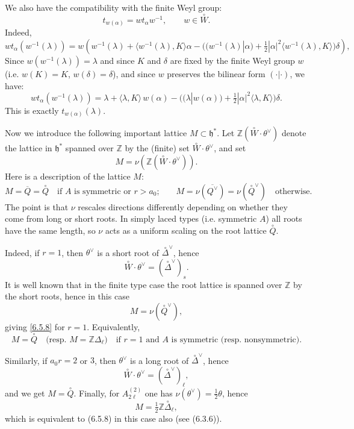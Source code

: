 \documentclass[12pt]{article}
\begin{document}
We also have the compatibility with the finite Weyl group:
\begin{equation}
    t_{w(\alpha)} = w t_\alpha w^{-1}, \qquad w \in \overset{\circ}{W}.
\end{equation}
Indeed,
\[
    w t_\alpha (w^{-1}(\lambda))
    = w\!\left(w^{-1}(\lambda) + \langle w^{-1}(\lambda), K \rangle \alpha
    - \big( (w^{-1}(\lambda)|\alpha)
    + \tfrac{1}{2}|\alpha|^2 \langle w^{-1}(\lambda), K\rangle \big)\delta\right),
\]
Since $w(w^{-1}(\lambda)) = \lambda$ and since $K$ and $\delta$ are fixed by the finite Weyl group $w$ (i.e. $w(K)=K$, $w(\delta)=\delta$), and since $w$ preserves the bilinear form $(\cdot|\cdot)$, we have:
\[
    w t_\alpha(w^{-1}(\lambda)) = \lambda + \langle\lambda,K\rangle\, w(\alpha) - \Big((\lambda|w(\alpha)) + \tfrac12|\alpha|^2\langle \lambda,K\rangle\Big)\delta.
\]
This is exactly $t_{w(\alpha)}(\lambda)$.

Now we introduce the following important lattice $M \subset \mathfrak{h}^*$. Let $\mathbb{Z}(\overset{\circ}{W}\cdot \theta^\vee)$ denote the lattice in $\mathfrak{h}^*$
spanned over $\mathbb{Z}$ by the (finite) set $\overset{\circ}{W}\cdot \theta^\vee$, and set
\[
    M = \nu(\mathbb{Z}(\overset{\circ}{W}\cdot \theta^\vee)).
\]
Here is a description of the lattice $M$:
\begin{equation} \label{6.5.8}
    M = \overline{Q} = \overset{\circ}{Q} \quad \text{if $A$ is symmetric or $r > a_0$;}
    \qquad
    M = \nu(\overline{Q^\vee}) = \nu(\overset{\circ}{Q}^\vee) \quad \text{otherwise.}
\end{equation}
The point is that $\nu$ rescales directions differently depending on whether they come from long or short roots. In simply laced types (i.e. symmetric $A$) all roots have the same length, so $\nu$ acts as a uniform scaling on the root lattice $\overset{\circ}{Q}$.

Indeed, if $r=1$, then $\theta^\vee$ is a short root of $\overset{\circ}{\Delta}^\vee$, hence
\[
    \overset{\circ}{W}\cdot \theta^\vee = (\overset{\circ}{\Delta}^\vee)_s.
\]
It is well known that in the finite type case the root lattice is
spanned over $\mathbb{Z}$ by the short roots, hence in this case
\[
    M = \nu(\overset{\circ}{Q}^\vee),
\]
giving \eqref{6.5.8} for $r=1$. Equivalently,
\[
    M = \overset{\circ}{Q} \quad \text{(resp.\ $M = \mathbb{Z}\Delta_\ell$)}
    \quad \text{if $r=1$ and $A$ is symmetric (resp.\ nonsymmetric).}
\]

Similarly, if $a_0 r = 2$ or $3$, then $\theta^\vee$ is a long root of $\overset{\circ}{\Delta}^\vee$,
hence
\[
    \overset{\circ}{W} \cdot \theta^\vee = (\overset{\circ}{\Delta}^\vee)_\ell,
\]
and we get $M = \overset{\circ}{Q}$. Finally, for $A_{2\ell}^{(2)}$ one has $\nu(\theta^\vee) = \tfrac12 \theta$,
hence
\[
    M = \tfrac12 \mathbb{Z} \overset{\circ}{\Delta}_\ell,
\]
which is equivalent to (6.5.8) in this case also (see (6.3.6)).
\end{document}
